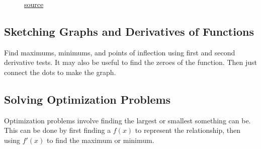 \documentclass[12pt]{article}
\begin{document}
\begin{figure}[H]
    \begin{center}
        \caption{\href{https://www.khanacademy.org/math/ap-calculus-ab/ab-diff-analytical-applications-new/ab-5-6b/a/review-analyzing-the-second-derivative-to-find-inflection-points}{source}}
        \label{fig:concavityinflection}
    \end{center}
\end{figure}

\subsection{Sketching Graphs and Derivatives of Functions} %
Find maximums, minimums, and points of inflection using first and second derivative tests. It may also be useful to find the zeroes of the function. Then just connect the dots to make the graph.

\subsection{Solving Optimization Problems}
Optimization problems involve finding the largest or smallest something can be. This can be done by first finding a $f(x)$ to represent the relationship, then using $f'(x)$ to find the maximum or minimum.
\end{document}
